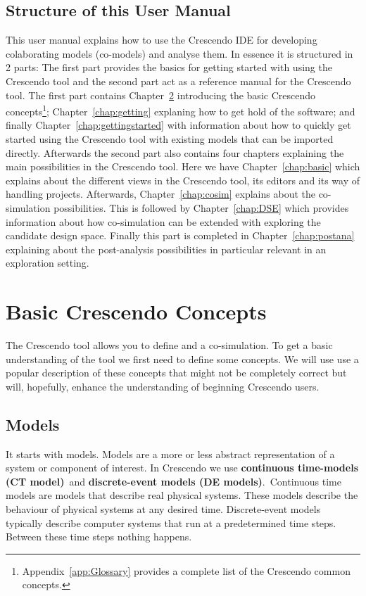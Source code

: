 \documentclass{crescendorepchap}
\begin{document}
\section{Structure of this User Manual}\label{sec:structure}

This user manual explains how to use the Crescendo IDE for developing colaborating models
 (co-models) and analyse them. In essence it is structured in 2 parts: The first part provides the basics for getting started with using the Crescendo tool and the second part act as a reference manual for the Crescendo tool. The first part contains Chapter~\ref{chap:introconcepts} introducing the basic Crescendo concepts\footnote{Appendix~\ref{app:Glossary} provides a complete list of the Crescendo common concepts.};
Chapter~\ref{chap:getting} explaning how to get hold of the software; and finally
Chapter~\ref{chap:gettingstarted} with information about how to quickly get started using the Crescendo tool with existing models that can be imported directly. Afterwards the second part also contains four chapters explaining the main possibilities in the Crescendo tool. Here we have Chapter~\ref{chap:basic} which explains about the different views in the Crescendo tool, its editors and its way of handling projects. Afterwards, Chapter~\ref{chap:cosim} explains about the co-simulation possibilities. This is followed by Chapter~\ref{chap:DSE} which provides information about how co-simulation can be extended with exploring the candidate design space. Finally this part is completed in Chapter~\ref{chap:postana} explaining about the post-analysis possibilities in particular relevant in an exploration setting.

\chapter{Basic Crescendo Concepts}\label{chap:introconcepts}

The Crescendo tool allows you to define and a co-simulation. To get a
basic understanding of the tool we first need to define some concepts.
We will use use a popular description of these concepts that might not
be completely correct but will, hopefully, enhance the understanding of
beginning Crescendo users.

\section{Models}

It starts with models. Models are a more or less abstract representation
of a system or component of interest. In Crescendo we use
\textbf{continuous time-models (CT model)}~and \textbf{discrete-event
models (DE models)}.~Continuous time models are models that describe
real physical systems. These models describe the behaviour of physical
systems at any desired time. Discrete-event models typically describe
computer systems that run at a predetermined time steps. Between these
time steps nothing happens.
\end{document}
